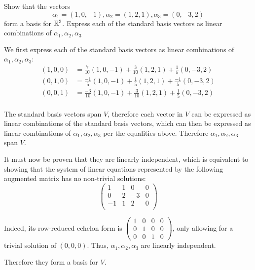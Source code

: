 \documentclass[a4paper, 10pt]{article}
\begin{document}
\begin{problem} 
Show that the vectors \[
    \alpha_1 = (1, 0, -1), \alpha_2 = (1, 2, 1), \alpha_3 = (0, -3, 2)
\]
form a basis for \(\mathbb{R}^3\). Express each of the standard basis vectors as linear combinations of \(\alpha_1, \alpha_2, \alpha_3\)
\end{problem}
\begin{solution}
    We first express each of the standard basis vectors as linear combinations of \(\alpha_1, \alpha_2, \alpha_3\):
    \begin{align*}
        (1, 0, 0) & = \frac{7}{10} (1, 0, -1) + \frac{3}{10} (1, 2, 1) + \frac{1}{5} (0, -3, 2)  \\
        (0, 1, 0) & = \frac{-1}{5} (1, 0, -1) + \frac{1}{5} (1, 2, 1) + \frac{-1}{5} (0, -3, 2)  \\
        (0, 0, 1) & = \frac{-3}{10} (1, 0, -1) + \frac{3}{10} (1, 2, 1) + \frac{1}{5} (0, -3, 2) \\
    \end{align*}

    The standard basis vectors span \(V\), therefore each vector in \(V\) can be expressed as linear combinations of the standard basis vectors, which can then be expressed as linear combinations of \(\alpha_1, \alpha_2, \alpha_3\) per the equalities above. Therefore \(\alpha_1, \alpha_2, \alpha_3\) span \(V\).

    It must now be proven that they are linearly independent, which is equivalent to showing that the system of linear equations represented by the following augmented matrix has no non-trivial solutions:
    \[
        \left(\begin{array}{ccc|c}
                1  & 1 & 0  & 0 \\
                0  & 2 & -3 & 0 \\
                -1 & 1 & 2  & 0 \\
            \end{array}\right)
    \]

    Indeed, its row-reduced echelon form is \(\left(\begin{array}{ccc|c}
            1 & 0 & 0 & 0 \\
            0 & 1 & 0 & 0 \\
            0 & 0 & 1 & 0
        \end{array}\right)\), only allowing for a trivial solution of \((0, 0, 0)\). Thus, \(\alpha_1, \alpha_2, \alpha_3\) are linearly independent.

    Therefore they form a basis for \(V\).
\end{solution}
\end{document}
